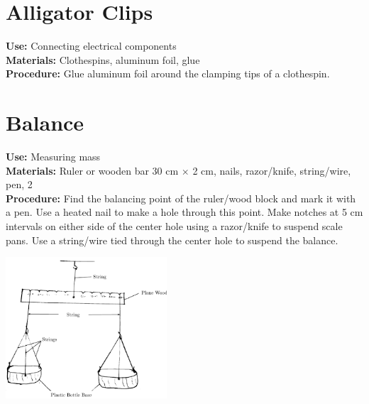\begin{multicols}{2}

\section{Alligator Clips}
\label{sec:alligator-clips}
\vspace{-10pt}
\textbf{Use:} Connecting electrical components\\
\textbf{Materials:} Clothespins, aluminum foil, glue\\
\textbf{Procedure:} Glue aluminum foil around the clamping tips of a clothespin.

\section{Balance}
\label{sec:balance}
\vspace{-10pt}
\textbf{Use:} Measuring mass\\
\textbf{Materials:} Ruler or wooden bar 30 cm $\times$ 2 cm, nails, razor/knife, string/wire, pen, 2 \\
\textbf{Procedure:} Find the balancing point of the ruler/wood block and mark it with a pen. Use a heated nail to make a hole through this point. Make notches at 5 cm intervals on either side of the center hole using a razor/knife to suspend scale pans. Use a string/wire tied through the center hole to suspend the balance.
\begin{center}
\includegraphics[width=0.45\textwidth]{./img/beam-balance.png}
\end{center}


\end{multicols}
